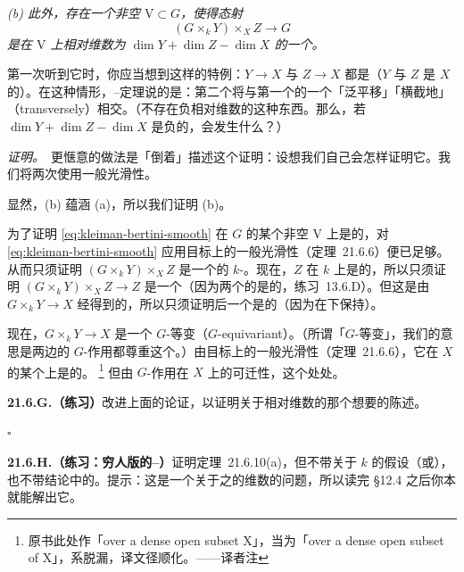 \emph{(b) 此外，存在一个非空\trOpenSubset{} $\mathrm{V}\subset G$，使得态射
\begin{equation*}
(G\times_k Y)\times_X Z\longrightarrow G
\tag{21.6.10.1}\label{eq:kleiman-bertini-smooth}
\end{equation*}
是在 $\mathrm{V}$ 上相对维数为 $\dim Y+\dim Z-\dim X$ 的一个\trSmooth\trMorphism。}

第一次听到它时，你应当想到这样的特例：$Y\to X$ 与 $Z\to X$ 都是\trLocallyClosedEmbedding（$Y$ 与 $Z$ 是 $X$ 的\trSmooth\trSubvariety）。在这种情形，\trKleiman--\trBertini{}定理说的是：第二个\trSubvariety{}将与第一个\trSubvariety{}的一个「泛平移」「横截地」（transversely）相交。（不存在负相对维数的\trSmooth\trMorphism{}这种东西。那么，若 $\dim Y+\dim Z-\dim X$ 是负的，会发生什么？）

\emph{证明。}\ 更惬意的做法是「倒着」描述这个证明：设想我们自己会怎样证明它。我们将两次使用一般光滑性。

显然，(b) 蕴涵 (a)，所以我们证明 (b)。

为了证明\trMorphism{} \eqref{eq:kleiman-bertini-smooth} 在 $G$ 的某个非空\trOpenSet{} $\mathrm{V}$ 上是\trSmooth{}的，对 \eqref{eq:kleiman-bertini-smooth} 应用目标上的一般光滑性（\mbox{定理~21.6.6}）便已足够。从而只须证明 $(G\times_k Y)\times_X Z$ 是一个\trSmooth{}的 $k$-\trVariety。现在，$Z$ 在 $k$ 上是\trSmooth{}的，所以只须证明 $(G\times_k Y)\times_X Z\to Z$ 是一个\trSmooth\trMorphism（因为两个\trSmooth\trMorphisms{}的\trComposition{}是\trSmooth{}的，\mbox{练习~13.6.D}）。但这是由 $G\times_k Y\to X$ 经\trBaseChange{}得到的，所以只须证明后一个\trMorphism{}是\trSmooth{}的（因为\trSmoothness{}在\trBaseChange{}下保持）。

现在，$G\times_k Y\to X$ 是一个 $G$-等变（$G$-equivariant）\trMorphism。（所谓「$G$-等变」，我们的意思是两边的 $G$-作用都尊重这个\trMorphism。）由目标上的一般光滑性（\mbox{定理~21.6.6}），它在 $X$ 的某个\trDense\trOpenSubset{}上是\trSmooth{}的。%
\footnote{原书此处作「over a dense open subset X」，当为「over a dense open subset of X」，系脱漏，译文径顺化。——译者注}
但由 $G$-作用在 $X$ 上的可迁性，这个\trMorphism{}处处\trSmooth。

\textbf{21.6.G.（练习）}\quad 改进上面的论证，以证明关于相对维数的那个想要的陈述。

\begin{flushright}
$\square$
\end{flushright}

\textbf{21.6.H.（练习：穷人版的\trKleiman--\trBertini）}\quad 证明\mbox{定理~21.6.10}(a)，但不带关于 $k$ 的假设（\trAlgClosed{}或\trCharacteristic），也不带结论中的\trSmoothness。提示：这是一个关于\trMorphisms{}之\trFiber{}的维数的问题，所以读完 \S12.4 之后你本就能解出它。

